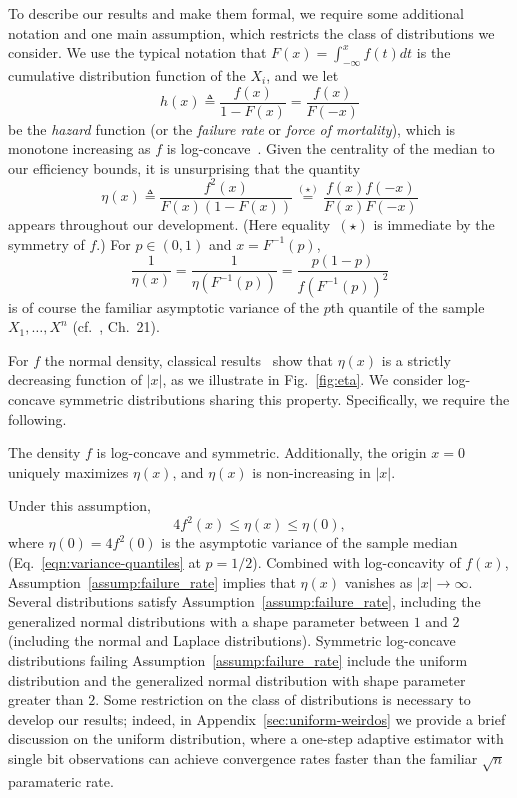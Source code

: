 To describe our results and make them formal, we require some additional
notation and one main assumption, which restricts the class of distributions
we consider.  We use the typical notation that
$F(x) = \int_{-\infty}^x f(t) dt$ is the cumulative distribution function
of the $X_i$, and we let
\begin{equation*}
  h(x) \triangleq \frac{f(x)}{1-F(x)} = \frac{f(x)}{F(-x)}
\end{equation*}
be the \emph{hazard} function (or the \emph{failure rate} or \emph{force of
  mortality}), which is monotone increasing as $f$ is
log-concave~\cite{bagnoli2005log}. Given the centrality of the median
to our efficiency bounds, it is unsurprising that the quantity
\begin{equation}
  \label{eq:eta_def}
  \eta(x) \triangleq \frac{f^2(x)}{F(x)(1-F(x))}
  \stackrel{(\star)}{=} \frac{f(x)f(-x)}{F(x)F(-x)}
\end{equation}
appears throughout our development. (Here equality~$(\star)$ is immediate by
the symmetry of $f$.)  For $p \in (0, 1)$ and $x = F^{-1}(p)$,
\begin{equation}
  \label{eqn:variance-quantiles}
  \frac{1}{\eta(x)} =
  \frac{1}{\eta(F^{-1}(p))}
  = \frac{p (1 - p)}{f(F^{-1}(p))^2}
\end{equation}
is of course the familiar asymptotic variance of the $p$th quantile of the sample $X_1,\ldots,X^n$ (cf.~\cite{VanDerVaart98}, Ch.~21).

For $f$ the normal density, classical results~\cite{Samford1953,
  hammersley1950estimating} show that $\eta(x)$ is a strictly
decreasing function of $|x|$, as we illustrate in Fig.~\ref{fig:eta}.
%
We consider log-concave symmetric distributions sharing this
property.  Specifically, we require the following.
\begin{assumption}
  \label{assump:failure_rate}
  The density $f$ is log-concave and symmetric.  Additionally, the origin $x
  = 0$ uniquely maximizes $\eta(x)$, and $\eta(x)$ is non-increasing in
  $|x|$.
\end{assumption}
Under this assumption,
\begin{equation*}
  4 f^2(x) \leq \eta(x) \leq \eta(0),
\end{equation*} 
%
where $\eta(0) = 4 f^2(0)$ is the asymptotic variance of the sample median
(Eq.~\eqref{eqn:variance-quantiles} at $p = 1/2$).  Combined with
log-concavity of $f(x)$, Assumption~\ref{assump:failure_rate} implies that
$\eta(x)$ vanishes as $|x|\rightarrow \infty$.  Several distributions
satisfy Assumption~\ref{assump:failure_rate}, including the generalized
normal distributions with a shape parameter between $1$ and $2$ (including
the normal and Laplace distributions). Symmetric log-concave distributions
failing Assumption~\ref{assump:failure_rate} include the uniform
distribution and the generalized normal distribution with shape parameter
greater than $2$. Some restriction on the class of distributions is
necessary to develop our results; indeed, in
Appendix~\ref{sec:uniform-weirdos} we provide a brief discussion on the
uniform distribution, where a one-step adaptive estimator with single bit
observations can achieve convergence rates faster than the familiar
$\sqrt{n}$ paramateric rate.

